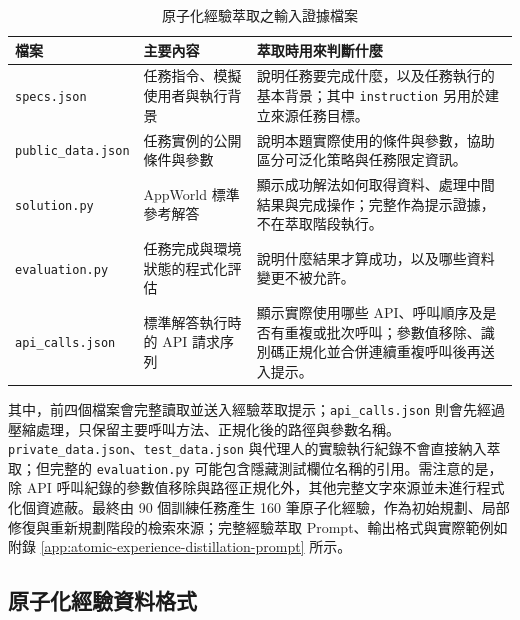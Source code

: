 \begin{ZhChapter}
\begin{table}[htbp]
    \centering
    \caption{原子化經驗萃取之輸入證據檔案}
    \label{tab:experience_evidence_files}
    \small
    \renewcommand{\arraystretch}{1.15}
    \begin{tabularx}{0.95\textwidth}{
        >{\raggedright\arraybackslash}p{}
        >{\raggedright\arraybackslash}p{}
        >{\raggedright\arraybackslash}X
    }
        \hline
        \textbf{檔案} & \textbf{主要內容} & \textbf{萃取時用來判斷什麼} \\
        \hline
        \texttt{specs.json} &
        任務指令、模擬使用者與執行背景 &
        說明任務要完成什麼，以及任務執行的基本背景；其中 \texttt{instruction} 另用於建立來源任務目標。 \\
        \texttt{public\_data.json} &
        任務實例的公開條件與參數 &
        說明本題實際使用的條件與參數，協助區分可泛化策略與任務限定資訊。 \\
        \texttt{solution.py} &
        AppWorld 標準參考解答 &
        顯示成功解法如何取得資料、處理中間結果與完成操作；完整作為提示證據，不在萃取階段執行。 \\
        \texttt{evaluation.py} &
        任務完成與環境狀態的程式化評估 &
        說明什麼結果才算成功，以及哪些資料變更不被允許。 \\
        \texttt{api\_calls.json} &
        標準解答執行時的 API 請求序列 &
        顯示實際使用哪些 API、呼叫順序及是否有重複或批次呼叫；參數值移除、識別碼正規化並合併連續重複呼叫後再送入提示。 \\
        \hline
    \end{tabularx}
\end{table}

其中，前四個檔案會完整讀取並送入經驗萃取提示；\texttt{api\_calls.json} 則會先經過壓縮處理，只保留主要呼叫方法、正規化後的路徑與參數名稱。\texttt{private\_data.json}、\texttt{test\_data.json} 與代理人的實驗執行紀錄不會直接納入萃取；但完整的 \texttt{evaluation.py} 可能包含隱藏測試欄位名稱的引用。需注意的是，除 API 呼叫紀錄的參數值移除與路徑正規化外，其他完整文字來源並未進行程式化個資遮蔽。最終由 90 個訓練任務產生 160 筆原子化經驗，作為初始規劃、局部修復與重新規劃階段的檢索來源；完整經驗萃取 Prompt、輸出格式與實際範例如附錄 \ref{app:atomic-experience-distillation-prompt} 所示。

\subsection{原子化經驗資料格式}


\end{ZhChapter}
